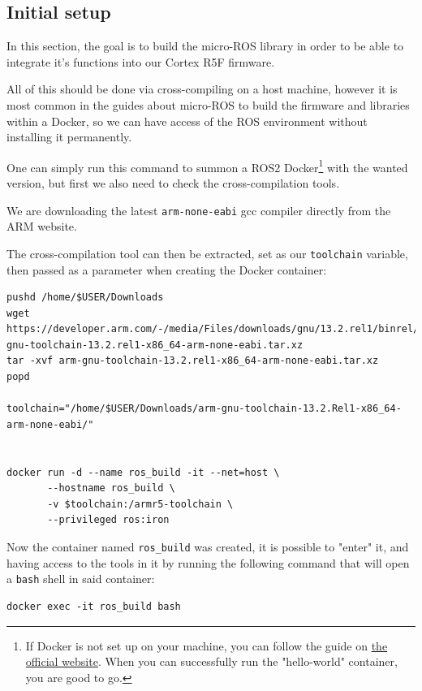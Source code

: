 \documentclass[10pt]{article}
\begin{document}
\subsection{Initial setup}
\label{sec:org90fb91f}
In this section, the goal is to build the micro-ROS library in order to be
able to integrate it's functions into our Cortex R5F firmware.

All of this should be done via cross-compiling on a host machine, however
it is most common in the guides about micro-ROS to build the firmware and libraries within a Docker,
so we can have access of the ROS environment without installing it permanently.

One can simply run this command to summon a ROS2 Docker\footnote{If Docker is not set up on your machine, you can follow the guide on \href{https://docs.docker.com/engine/install/ubuntu/}{the official website}.
When you can successfully run the "hello-world" container, you are good to go.} with the wanted version,
but first we also need to check the cross-compilation tools.

We are downloading the latest \texttt{arm-none-eabi} gcc compiler directly from the ARM website.

The cross-compilation tool can then be extracted, set as our \texttt{toolchain} variable,
then passed as a parameter when creating the Docker container:
\begin{verbatim}
pushd /home/$USER/Downloads
wget https://developer.arm.com/-/media/Files/downloads/gnu/13.2.rel1/binrel/arm-gnu-toolchain-13.2.rel1-x86_64-arm-none-eabi.tar.xz
tar -xvf arm-gnu-toolchain-13.2.rel1-x86_64-arm-none-eabi.tar.xz
popd

toolchain="/home/$USER/Downloads/arm-gnu-toolchain-13.2.Rel1-x86_64-arm-none-eabi/"


docker run -d --name ros_build -it --net=host \
       --hostname ros_build \
       -v $toolchain:/armr5-toolchain \
       --privileged ros:iron
\end{verbatim}

Now the container named \texttt{ros\_build} was created, it is possible to "enter" it, and having access
to the tools in it by running the following command that will open a \texttt{bash} shell in said container:
\begin{verbatim}
docker exec -it ros_build bash
\end{verbatim}
\end{document}

